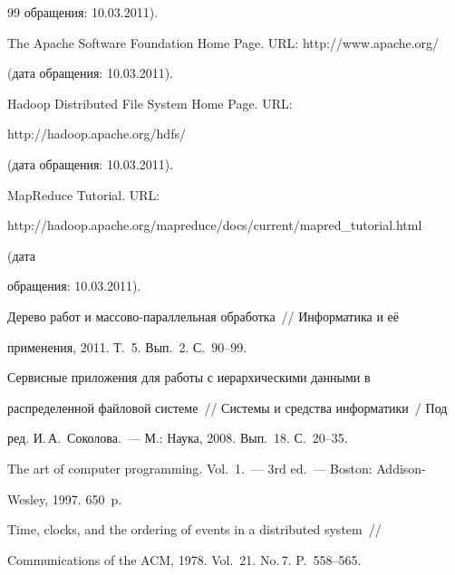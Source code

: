 {{\begin{thebibliography}{99}
обращения: 10.03.2011).







The Apache Software Foundation Home Page. {\sf URL: http:/\!\!/www.apache.org/} 


(дата обращения: 10.03.2011).







Hadoop Distributed File System Home Page. URL: {\sf 


http:/\!\!/hadoop.apache.org/hdfs/} (дата обращения: 10.03.2011).







MapReduce Tutorial. URL:  {\sf 


http:/\!\!/hadoop.apache.org/mapreduce/docs/current/\linebreak mapred\_tutorial.html} (дата 


обращения: 10.03.2011).









Дерево работ и массово-параллельная обработка~/\!\!/ Информатика и её 


применения, 2011. Т.~5. Вып.~2.  С.~90--99.









Сервисные приложения для работы с иерархическими данными в 


распределенной файловой системе~/\!\!/ Системы и средства информатики~/ Под 


ред. И.\,А.~Соколова.~--- М.: Наука, 2008. Вып.~18. С.~20--35.









The art of computer programming. Vol.~1.~--- 3rd ed.~--- Boston: Addison-


Wesley, 1997. 650~p.





\label{end\stat}









Time, clocks, and the ordering of events in a distributed system~/\!\!/ 


Communications of the ACM, 1978.  Vol.~21. No.\,7.  P.~558--565.


      


 \end{thebibliography}


}


}


